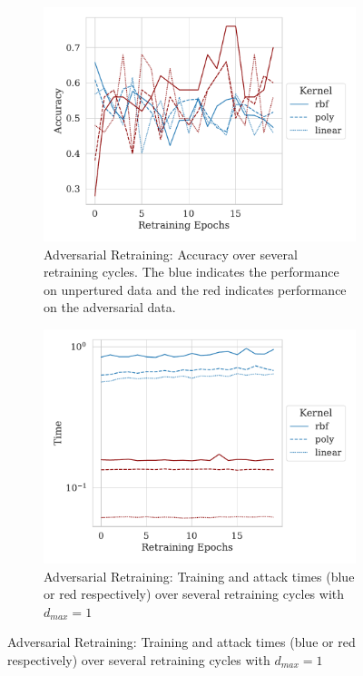 \documentclass[fonts]{icst}
\begin{document}
\begin{figure}
     \centering
     \begin{subfigure}[b]{0.45\textwidth}
         \centering
         \includegraphics[width=\textwidth]{./generated/retrain_accuracy.pdf}
         \caption{Adversarial Retraining: Accuracy over several retraining cycles. The blue indicates the performance on unpertured data and the red indicates performance on the adversarial data.}
        \label{fig:retrain_acc}
     \end{subfigure}
     \hfill
     \begin{subfigure}[b]{0.45\textwidth}
         \centering
         \includegraphics[width=\textwidth]{./generated/retrain_time.pdf}
         \caption{Adversarial Retraining: Training and attack times (blue or red respectively) over several retraining cycles with $d_{max} = 1$}

\end{subfigure}
\end{figure}
\end{document}

